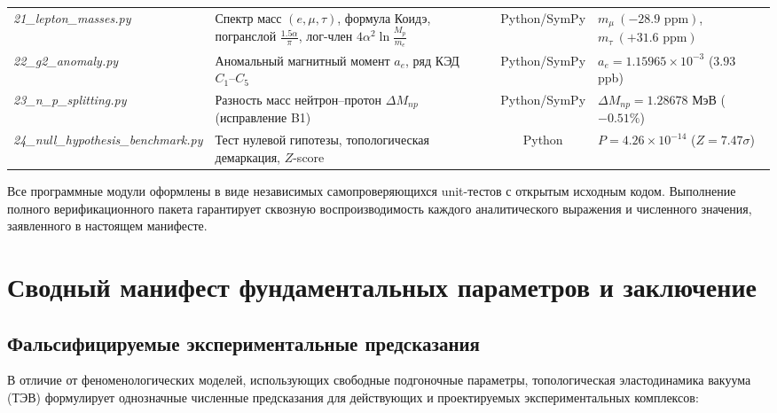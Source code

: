 \documentclass[11pt,a4paper]{article}
\theoremstyle{definition}
\theoremstyle{remark}
\begin{document}
\begin{table}[H]
\begin{tabularx}{\textwidth}{l p{5.5cm} c >{\raggedleft\arraybackslash}X}
\textit{21\_lepton\_masses.py} & Спектр масс $(e,\mu,\tau)$, формула Коидэ, погранслой $\frac{1.5\alpha}{\pi}$, лог-член $4\alpha^2\ln\frac{M_p}{m_e}$ & Python/SymPy & $m_\mu\ (-28.9\text{ ppm})$, $m_\tau\ (+31.6\text{ ppm})$ \\
\textit{22\_g2\_anomaly.py} & Аномальный магнитный момент $a_e$, ряд КЭД $C_1\text{--}C_5$ & Python/SymPy & $a_e=1.15965\times10^{-3}$ ($3.93$ ppb) \\
\textit{23\_n\_p\_splitting.py} & Разность масс нейтрон--протон $\Delta M_{np}$ (исправление B1) & Python/SymPy & $\Delta M_{np}=1.28678$ МэВ ($-0.51\%$) \\
\textit{24\_null\_hypothesis\_benchmark.py} & Тест нулевой гипотезы, топологическая демаркация, $Z$-score & Python & $P=4.26\times10^{-14}$ ($Z=7.47\sigma$) \\
\bottomrule
\end{tabularx}
\end{table}

Все программные модули оформлены в виде независимых самопроверяющихся unit-тестов с открытым исходным кодом. Выполнение полного верификационного пакета гарантирует сквозную воспроизводимость каждого аналитического выражения и численного значения, заявленного в настоящем манифесте.


\section{Сводный манифест фундаментальных параметров и заключение}
\label{sec:master_manifest}

\subsection{Фальсифицируемые экспериментальные предсказания}
В отличие от феноменологических моделей, использующих свободные подгоночные параметры, топологическая эластодинамика вакуума (ТЭВ) формулирует однозначные численные предсказания для действующих и проектируемых экспериментальных комплексов:
\end{document}
